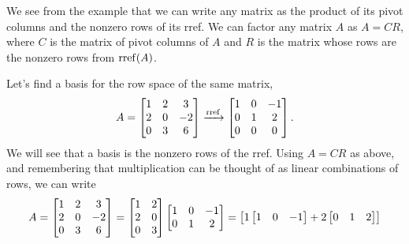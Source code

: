 We see from the example that we can write any matrix as the product of its pivot columns and the nonzero rows of its rref. We can factor any matrix $A$ as $A=CR$, where $C$ is the matrix of pivot columns of $A$ and $R$ is the matrix whose rows are the nonzero rows from $\operatorname{rref}(A)$.

\begin{example}\label{ex:row-space}
Let's find a basis for the row space of the same matrix, 
$$A=\begin{bmatrix}
\begin{matrix} 1\\2\\0 \end{matrix}
&\begin{matrix} 2\\0\\3 \end{matrix}
&\begin{matrix} 3\\-2\\6 \end{matrix}
\end{bmatrix}
\xrightarrow{\operatorname{rref}}
\begin{bmatrix}
\begin{matrix} 1\\0\\0 \end{matrix}
&\begin{matrix} 0\\1\\0 \end{matrix}
&\begin{matrix} -1\\2\\0 \end{matrix}
\end{bmatrix}.
$$
We will see that a basis is the nonzero rows of the rref. Using $A=CR$ as above, and remembering that multiplication can be thought of as linear combinations of rows, we can write  
\begin{align*}
A
=
\begin{bmatrix}
\begin{matrix} 1\\2\\0 \end{matrix}
&\begin{matrix} 2\\0\\3 \end{matrix}
&\begin{matrix} 3\\-2\\6 \end{matrix}
\end{bmatrix}
=
\begin{bmatrix}
\begin{matrix} 1\\2\\0 \end{matrix}
&\begin{matrix} 2\\0\\3 \end{matrix}
\end{bmatrix}
\begin{bmatrix}
\begin{matrix} 1\\0 \end{matrix}
&\begin{matrix} 0\\1 \end{matrix}
&\begin{matrix} -1\\2 \end{matrix}
\end{bmatrix}
=
\begin{bmatrix}
1\begin{bmatrix}1&0&-1\end{bmatrix} + 2 \begin{bmatrix}0&1&2\end{bmatrix}\\

\end{bmatrix}
\end{align*}
\end{example}
